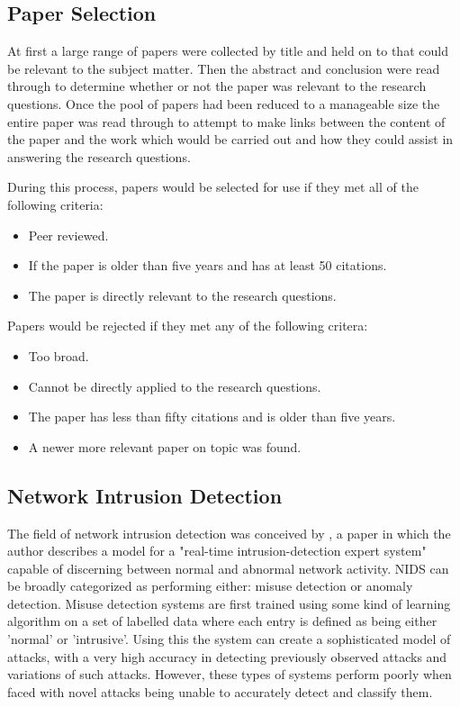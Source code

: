 	\subsection{Paper Selection}
	At first a large range of papers were collected by title and held on to that could be relevant to the subject matter. Then the abstract and conclusion were read through to determine whether or not the paper was relevant to the research questions. Once the pool of papers had been reduced to a manageable size the entire paper was read through to attempt to make links between the content of the paper and the work which would be carried out and how they could assist in answering the research questions. 

	\vspace{5mm}

	\noindent During this process, papers would be selected for use if they met all of the following criteria:
	\begin{itemize}
	\item Peer reviewed.
	\item If the paper is older than five years and has at least 50 citations.
	\item The paper is directly relevant to the research questions.
	\end{itemize} 
		
	\vspace{5mm}
	
	\noindent Papers would be rejected if they met any of the following critera:
	\begin{itemize}
	\item Too broad.
	\item Cannot be directly applied to the research questions.
	\item The paper has less than fifty citations and is older than five years.
	\item A newer more relevant paper on topic was found.
	\end{itemize}
	
	\subsection{Network Intrusion Detection}
	The field of network intrusion detection was conceived by \cite{denning1987intrusion}, a paper in which the author describes a model for a "real-time intrusion-detection expert system" capable of discerning between normal and abnormal network activity.
	NIDS can be broadly categorized as performing either: misuse detection or anomaly detection. 
	Misuse detection systems are first trained using some kind of learning algorithm on a set of labelled data where each entry is defined as being either 'normal' or 'intrusive'. Using this the system can create a sophisticated model of attacks, with a very high accuracy in detecting previously observed attacks and variations of such attacks. However, these types of systems perform poorly when faced with novel attacks being unable to accurately detect and classify them.
	

